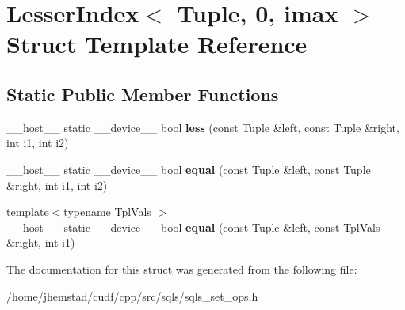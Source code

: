 \hypertarget{structLesserIndex_3_01Tuple_00_010_00_01imax_01_4}{}\section{Lesser\+Index$<$ Tuple, 0, imax $>$ Struct Template Reference}
\label{structLesserIndex_3_01Tuple_00_010_00_01imax_01_4}
\subsection*{Static Public Member Functions}
\begin{DoxyCompactItemize}
\item 
\+\_\+\+\_\+host\+\_\+\+\_\+ static \+\_\+\+\_\+device\+\_\+\+\_\+ bool {\bfseries less} (const Tuple \&left, const Tuple \&right, int i1, int i2)\hypertarget{structLesserIndex_3_01Tuple_00_010_00_01imax_01_4_a444c22ce835583dcc6ba5e66b0d3e580}{}\label{structLesserIndex_3_01Tuple_00_010_00_01imax_01_4_a444c22ce835583dcc6ba5e66b0d3e580}

\item 
\+\_\+\+\_\+host\+\_\+\+\_\+ static \+\_\+\+\_\+device\+\_\+\+\_\+ bool {\bfseries equal} (const Tuple \&left, const Tuple \&right, int i1, int i2)\hypertarget{structLesserIndex_3_01Tuple_00_010_00_01imax_01_4_a3a1085bc7bd14f2b3cf28fed47163b51}{}\label{structLesserIndex_3_01Tuple_00_010_00_01imax_01_4_a3a1085bc7bd14f2b3cf28fed47163b51}

\item 
{\footnotesize template$<$typename Tpl\+Vals $>$ }\\\+\_\+\+\_\+host\+\_\+\+\_\+ static \+\_\+\+\_\+device\+\_\+\+\_\+ bool {\bfseries equal} (const Tuple \&left, const Tpl\+Vals \&right, int i1)\hypertarget{structLesserIndex_3_01Tuple_00_010_00_01imax_01_4_a0a69a8a0e130e0b6d8d4df387cd8ba13}{}\label{structLesserIndex_3_01Tuple_00_010_00_01imax_01_4_a0a69a8a0e130e0b6d8d4df387cd8ba13}

\end{DoxyCompactItemize}


The documentation for this struct was generated from the following file\+:\begin{DoxyCompactItemize}
\item 
/home/jhemstad/cudf/cpp/src/sqls/sqls\+\_\+set\+\_\+ops.\+h\end{DoxyCompactItemize}
